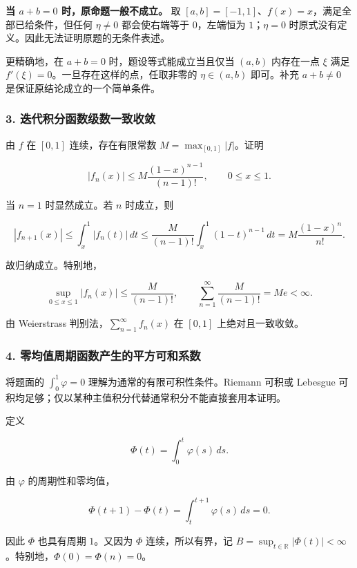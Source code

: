 \documentclass[11pt,fontset=fandol]{ctexart}
\begin{document}
\textbf{当 \(a+b=0\) 时，原命题一般不成立。} 取
\([a,b]=[-1,1]\)、\(f(x)=x\)，满足全部已给条件，但任何 \(\eta\ne0\)
都会使右端等于 \(0\)，左端恒为 \(1\)；\(\eta=0\)
时原式没有定义。因此无法证明原题的无条件表述。

更精确地，在 \(a+b=0\) 时，题设等式能成立当且仅当 \((a,b)\) 内存在一点
\(\xi\) 满足 \(f'(\xi)=0\)。一旦存在这样的点，任取非零的
\(\eta\in(a,b)\) 即可。补充 \(a+b\ne0\) 是保证原结论成立的一个简单条件。

\subsubsection{3.
迭代积分函数级数一致收敛}\label{ux8fedux4ee3ux79efux5206ux51fdux6570ux7ea7ux6570ux4e00ux81f4ux6536ux655b}

由 \(f\) 在 \([0,1]\) 连续，存在有限常数 \(M=\max_{[0,1]}|f|\)。证明

\[
|f_n(x)|\le M\frac{(1-x)^{n-1}}{(n-1)!},\qquad 0\le x\le1.
\]

当 \(n=1\) 时显然成立。若 \(n\) 时成立，则

\[
|f_{n+1}(x)|
\le\int_x^1|f_n(t)|\,dt
\le\frac{M}{(n-1)!}\int_x^1(1-t)^{n-1}\,dt
=M\frac{(1-x)^n}{n!}.
\]

故归纳成立。特别地，

\[
\sup_{0\le x\le1}|f_n(x)|\le\frac{M}{(n-1)!},
\qquad \sum_{n=1}^\infty\frac{M}{(n-1)!}=Me<\infty.
\]

由 Weierstrass
判别法，\(\boxed{\sum_{n=1}^\infty f_n(x)\text{ 在 }[0,1]\text{ 上绝对且一致收敛}}\)。

\subsubsection{4.
零均值周期函数产生的平方可和系数}\label{ux96f6ux5747ux503cux5468ux671fux51fdux6570ux4ea7ux751fux7684ux5e73ux65b9ux53efux548cux7cfbux6570}

将题面的 \(\int_0^1\varphi=0\) 理解为通常的有限可积性条件。Riemann
可积或 Lebesgue
可积均足够；仅以某种主值积分代替通常积分不能直接套用本证明。

定义

\[
\Phi(t)=\int_0^t\varphi(s)\,ds.
\]

由 \(\varphi\) 的周期性和零均值，

\[
\Phi(t+1)-\Phi(t)=\int_t^{t+1}\varphi(s)\,ds=0.
\]

因此 \(\Phi\) 也具有周期 \(1\)。又因为 \(\Phi\) 连续，所以有界，记
\(B=\sup_{t\in\mathbb R}|\Phi(t)|<\infty\)。特别地，\(\Phi(0)=\Phi(n)=0\)。
\end{document}

